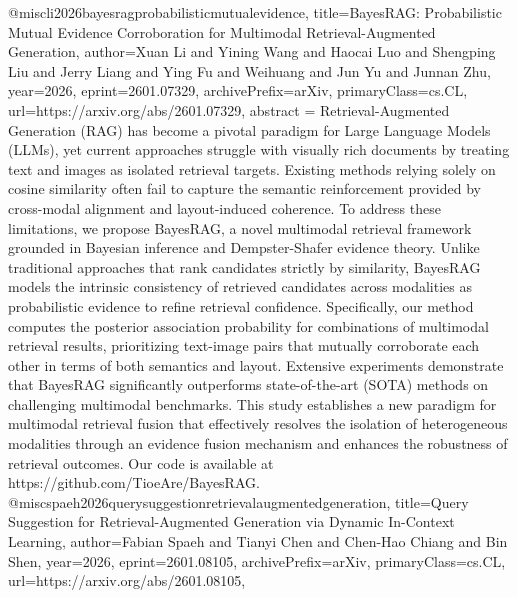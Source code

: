 {}@misc{li2026bayesragprobabilisticmutualevidence,
      title={BayesRAG: Probabilistic Mutual Evidence Corroboration for Multimodal Retrieval-Augmented Generation}, 
      author={Xuan Li and Yining Wang and Haocai Luo and Shengping Liu and Jerry Liang and Ying Fu and Weihuang and Jun Yu and Junnan Zhu},
      year={2026},
      eprint={2601.07329},
      archivePrefix={arXiv},
      primaryClass={cs.CL},
      url={https://arxiv.org/abs/2601.07329},
      abstract = {Retrieval-Augmented Generation (RAG) has become a pivotal paradigm for Large Language Models (LLMs), yet current approaches struggle with visually rich documents by treating text and images as isolated retrieval targets. Existing methods relying solely on cosine similarity often fail to capture the semantic reinforcement provided by cross-modal alignment and layout-induced coherence. To address these limitations, we propose BayesRAG, a novel multimodal retrieval framework grounded in Bayesian inference and Dempster-Shafer evidence theory. Unlike traditional approaches that rank candidates strictly by similarity, BayesRAG models the intrinsic consistency of retrieved candidates across modalities as probabilistic evidence to refine retrieval confidence. Specifically, our method computes the posterior association probability for combinations of multimodal retrieval results, prioritizing text-image pairs that mutually corroborate each other in terms of both semantics and layout. Extensive experiments demonstrate that BayesRAG significantly outperforms state-of-the-art (SOTA) methods on challenging multimodal benchmarks. This study establishes a new paradigm for multimodal retrieval fusion that effectively resolves the isolation of heterogeneous modalities through an evidence fusion mechanism and enhances the robustness of retrieval outcomes. Our code is available at https://github.com/TioeAre/BayesRAG.}
}@misc{spaeh2026querysuggestionretrievalaugmentedgeneration,
      title={Query Suggestion for Retrieval-Augmented Generation via Dynamic In-Context Learning}, 
      author={Fabian Spaeh and Tianyi Chen and Chen-Hao Chiang and Bin Shen},
      year={2026},
      eprint={2601.08105},
      archivePrefix={arXiv},
      primaryClass={cs.CL},
      url={https://arxiv.org/abs/2601.08105},
}
